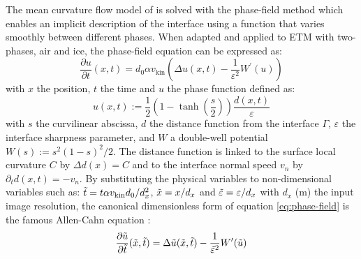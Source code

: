 \documentclass[draft,ms]{agujournal2019}
\begin{document}
The mean curvature flow model of  is solved with the phase-field method which enables an implicit description of the interface using a function that varies smoothly between different phases. When adapted and applied to ETM with two-phases, air and ice, the phase-field equation can be expressed as:\\
\begin{equation}\label{eq:phase-field}\frac{\partial u}{\partial t}(x, t)= d_0 \alpha v_{\mathrm{kin}} \left(\Delta u(x, t)-\frac{1}{\varepsilon^{2}} W^{\prime}(u)\right)\end{equation}
\noindent with $x$ the position, $t$ the time and $u$ the phase function defined as: \begin{equation}\label{eq:phase-func}
u(x,t) := \frac{1}{2}\left(1-\tanh\left(\frac{s}{2}\right)\right)\frac{d(x,t)}{\varepsilon}
\end{equation}
with $s$ the curvilinear  abscissa, $d$ the distance function from the interface $\Gamma$, $\varepsilon$ the interface sharpness parameter, and $W$ a double-well potential $W(s):= s^{2}(1-s)^{2}/2$. The distance function is linked to the surface local curvature $C$ by $\Delta d(x) = C$ and to the interface normal speed $v_n$ by $\partial_t d (x,t) = - v_n$. By substituting the physical variables to non-dimensional variables such as: $\Tilde{t} = t \alpha v_{\mathrm{kin}} d_0 / d_x^2 $, $\Tilde{x} = x/d_x$ and $\Tilde{\varepsilon} = \varepsilon/d_x$ with $d_x$ (m) the input image resolution, the canonical dimensionless form of equation \ref{eq:phase-field} is the famous Allen-Cahn equation \cite{kaempfer_phase-field_2009, bretin_and_denis_discrete-continuous_2015}:
\begin{equation}\label{eq:allen-cahn}\frac{\partial \Tilde{u}}{\partial \Tilde{t}}(\Tilde{x}, \Tilde{t})=\Delta \Tilde{u}(\Tilde{x}, \Tilde{t})-\frac{1}{\Tilde{\varepsilon}^{2}} W^{\prime}(\Tilde{u})\end{equation}

\end{document}
